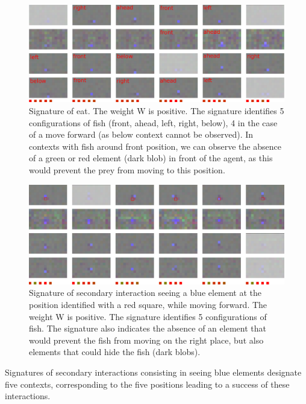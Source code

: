 \documentclass[conference]{IEEEtran}
\begin{document}
\begin{figure}[t]
\centerline{\includegraphics[scale=0.32]{img/sig_eat.pdf}}
\caption{Signature of eat. The weight W is positive. %
The signature identifies 5 configurations of fish (front, ahead, left, right, below), 4 in the case of a move forward (as below context cannot be observed). In contexts with fish around front position, we can observe the absence of a green or red element (dark blob) in front of the agent, as this would prevent the prey from moving to this position.}
\label{fig}
\end{figure}

\begin{figure}[t]
\centerline{\includegraphics[scale=0.32]{img/sig_blue.pdf}}
\caption{Signature of secondary interaction seeing a blue element at the position identified with a red square, while moving forward. The weight W is positive. The signature identifies 5 configurations of fish. The signature also indicates the absence of an element that would prevent the fish from moving on the right place, but also elements that could hide the fish (dark blobs).}
\label{fig:sigblue}
\end{figure}

Signatures of secondary interactions consisting in seeing blue elements designate five contexts, corresponding to the five positions leading to a success of these interactions.

\end{document}

